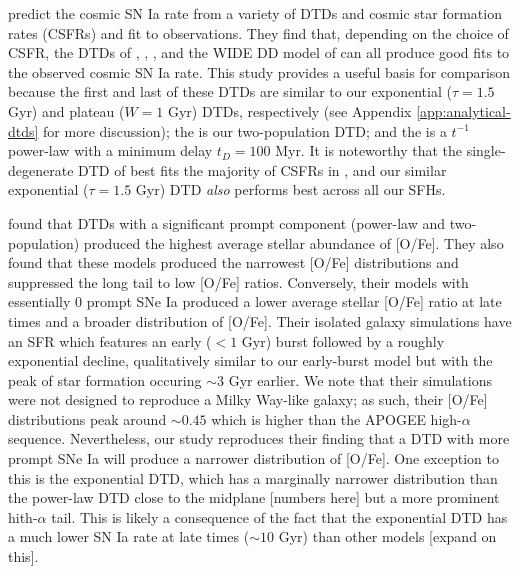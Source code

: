 \documentclass[twocolumn,twocolappendix,linenumbers,trackchanges]{aastex631}
\begin{document}
\citet{Palicio2024-CosmicSNIaRate} predict the cosmic SN Ia rate from a variety of DTDs and cosmic star formation rates (CSFRs) and fit to observations. They find that, depending on the choice of CSFR, the DTDs of \citet{MatteucciRecchi2001-SNIaTimescale}, \citet{Mannucci2006-TwoPopulations}, \citet{Totani2008-DTD}, and the WIDE DD model of \citet{Greggio2005-AnalyticalRates} can all produce good fits to the observed cosmic SN Ia rate. This study provides a useful basis for comparison because the first and last of these DTDs are similar to our exponential ($\tau=1.5$ Gyr) and plateau ($W=1$ Gyr) DTDs, respectively (see Appendix \ref{app:analytical-dtds} for more discussion); the \citet{Mannucci2006-TwoPopulations} is our two-population DTD; and the \citet{Totani2008-DTD} is a $t^{-1}$ power-law with a minimum delay $t_D=100$ Myr. It is noteworthy that the single-degenerate DTD of \citet{MatteucciRecchi2001-SNIaTimescale} best fits the majority of CSFRs in \citet{Palicio2024-CosmicSNIaRate}, and our similar exponential ($\tau=1.5$ Gyr) DTD {\it also} performs best across all our SFHs.

\citet{Poulhazan2018-PrecisionPollution} found that DTDs with a significant prompt component (power-law and two-population) produced the highest average stellar abundance of [O/Fe]. They also found that these models produced the narrowest [O/Fe] distributions and suppressed the long tail to low [O/Fe] ratios. Conversely, their models with essentially 0 prompt SNe Ia produced a lower average stellar [O/Fe] ratio at late times and a broader distribution of [O/Fe]. Their isolated galaxy simulations have an SFR which features an early ($<1$ Gyr) burst followed by a roughly exponential decline, qualitatively similar to our early-burst model but with the peak of star formation occuring $\sim3$ Gyr earlier. We note that their simulations were not designed to reproduce a Milky Way-like galaxy; as such, their [O/Fe] distributions peak around $\sim0.45$ which is higher than the APOGEE high-$\alpha$ sequence. Nevertheless, our study reproduces their finding that a DTD with more prompt SNe Ia will produce a narrower distribution of [O/Fe]. One exception to this is the exponential DTD, which has a marginally narrower distribution than the power-law DTD close to the midplane [numbers here] but a more prominent hith-$\alpha$ tail. This is likely a consequence of the fact that the exponential DTD has a much lower SN Ia rate at late times ($\sim10$ Gyr) than other models [expand on this].
\end{document}
